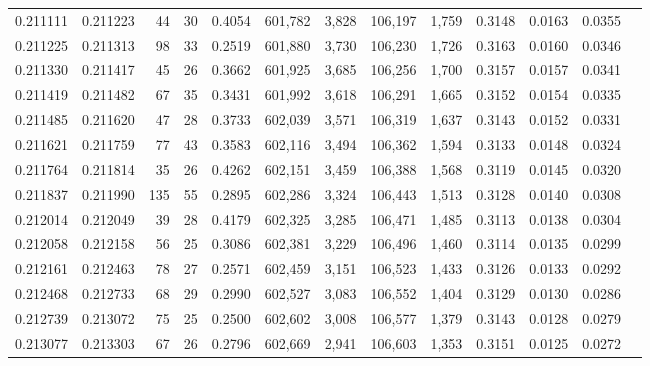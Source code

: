 \begin{tabular}{rrrrrrrrrrrrr}
0.211111 & 0.211223 &    44 &  30 &                                     0.4054 & 601,782 &   3,828 & 106,197 &   1,759 & 0.3148 & 0.0163 & 0.0355 \\
0.211225 & 0.211313 &    98 &  33 &                                     0.2519 & 601,880 &   3,730 & 106,230 &   1,726 & 0.3163 & 0.0160 & 0.0346 \\
0.211330 & 0.211417 &    45 &  26 &                                     0.3662 & 601,925 &   3,685 & 106,256 &   1,700 & 0.3157 & 0.0157 & 0.0341 \\
0.211419 & 0.211482 &    67 &  35 &                                     0.3431 & 601,992 &   3,618 & 106,291 &   1,665 & 0.3152 & 0.0154 & 0.0335 \\
0.211485 & 0.211620 &    47 &  28 &                                     0.3733 & 602,039 &   3,571 & 106,319 &   1,637 & 0.3143 & 0.0152 & 0.0331 \\
0.211621 & 0.211759 &    77 &  43 &                                     0.3583 & 602,116 &   3,494 & 106,362 &   1,594 & 0.3133 & 0.0148 & 0.0324 \\
0.211764 & 0.211814 &    35 &  26 &                                     0.4262 & 602,151 &   3,459 & 106,388 &   1,568 & 0.3119 & 0.0145 & 0.0320 \\
0.211837 & 0.211990 &   135 &  55 &                                     0.2895 & 602,286 &   3,324 & 106,443 &   1,513 & 0.3128 & 0.0140 & 0.0308 \\
0.212014 & 0.212049 &    39 &  28 &                                     0.4179 & 602,325 &   3,285 & 106,471 &   1,485 & 0.3113 & 0.0138 & 0.0304 \\
0.212058 & 0.212158 &    56 &  25 &                                     0.3086 & 602,381 &   3,229 & 106,496 &   1,460 & 0.3114 & 0.0135 & 0.0299 \\
0.212161 & 0.212463 &    78 &  27 &                                     0.2571 & 602,459 &   3,151 & 106,523 &   1,433 & 0.3126 & 0.0133 & 0.0292 \\
0.212468 & 0.212733 &    68 &  29 &                                     0.2990 & 602,527 &   3,083 & 106,552 &   1,404 & 0.3129 & 0.0130 & 0.0286 \\
0.212739 & 0.213072 &    75 &  25 &                                     0.2500 & 602,602 &   3,008 & 106,577 &   1,379 & 0.3143 & 0.0128 & 0.0279 \\
0.213077 & 0.213303 &    67 &  26 &                                     0.2796 & 602,669 &   2,941 & 106,603 &   1,353 & 0.3151 & 0.0125 & 0.0272 \\

\end{tabular}
